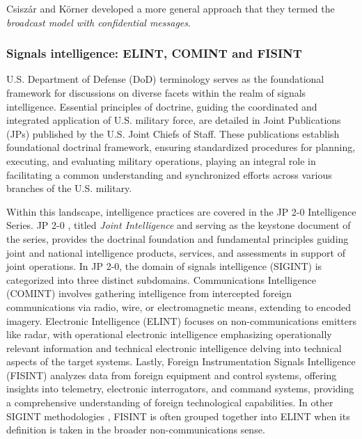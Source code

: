 \documentclass[english, 12pt, a4paper, elec, utf8, a-1b, online]{aaltothesis}
\begin{document}
Csiszár and Körner \cite{csiszar1978broadcast} developed a more general approach that they termed the \textit{broadcast model with confidential messages}.


\subsubsection{Signals intelligence: ELINT, COMINT and FISINT}
U.S. Department of Defense (DoD) terminology serves as the foundational framework for discussions on diverse facets within the realm of signals intelligence.
Essential principles of doctrine, guiding the coordinated and integrated application of U.S. military force, are detailed in Joint Publications (JPs) published by the U.S. Joint Chiefs of Staff.
These publications establish foundational doctrinal framework, ensuring standardized procedures for planning, executing, and evaluating military operations, playing an integral role in facilitating a common understanding and synchronized efforts across various branches of the U.S. military.

Within this landscape, intelligence practices are covered in the JP 2-0 Intelligence Series.
JP 2-0 \cite{jp2-0}, titled \textit{Joint Intelligence} and serving as the keystone document of the series, provides the doctrinal foundation and fundamental principles guiding joint and national intelligence products, services, and assessments in support of joint operations.
In JP 2-0, the domain of signals intelligence (SIGINT) is categorized into three distinct subdomains. Communications Intelligence (COMINT) involves gathering intelligence from intercepted foreign communications via radio, wire, or electromagnetic means, extending to encoded imagery.
Electronic Intelligence (ELINT) focuses on non-communications emitters like radar, with operational electronic intelligence emphasizing operationally relevant information and technical electronic intelligence delving into technical aspects of the target systems.
Lastly, Foreign Instrumentation Signals Intelligence (FISINT) analyzes data from foreign equipment and control systems, offering insights into telemetry, electronic interrogators, and command systems, providing a comprehensive understanding of foreign technological capabilities.
In other SIGINT methodologies \cite{kosola2013digitaalinen}, FISINT is often grouped together into ELINT when its definition is taken in the broader non-communications sense.
\end{document}
